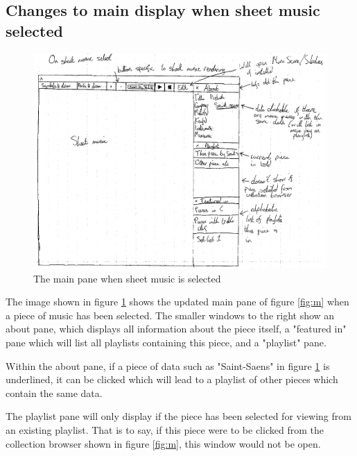 \begin{appendices}
\subsection{Changes to main display when sheet music selected}
\begin{figure}[H]
	\centering
	\includegraphics[width=400pt]{designs/sheet_music}
	\caption{The main pane when sheet music is selected}
	\label{fig:sheet}	
\end{figure}
The image shown in figure \ref{fig:sheet} shows the updated main pane of figure \ref{fig:m} when a piece of music has been selected. The smaller windows to the right show an about pane, which displays all information about the piece itself, a "featured in" pane which will list all playlists containing this piece, and a "playlist" pane. 

Within the about pane, if a piece of data such as "Saint-Saens" in figure \ref{fig:sheet} is underlined, it can be clicked which will lead to a playlist of other pieces which contain the same data.

The playlist pane will only display if the piece has been selected for viewing from an existing playlist. That is to say, if this piece were to be clicked from the collection browser shown in figure \ref{fig:m}, this window would not be open.


\end{appendices}
